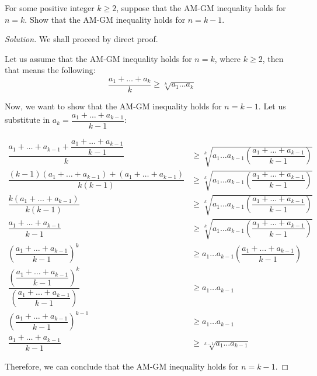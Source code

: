 \documentclass{article}
\newenvironment{solution}{\begin{proof}[Solution]}{\end{proof}}
\begin{document}
\begin{hw}
	For some positive integer $k \geq 2$, suppose that the AM-GM inequality holds for $n=k$. Show that the AM-GM inequality holds for $n=k-1$. 
\end{hw}
\begin{solution}
	We shall proceed by direct proof.
	
	Let us assume that the AM-GM inequality holds for $n=k$, where $k \geq 2$, then that means the following:
	\begin{equation*}
		\dfrac{a_{1} + \ldots + a_{k}}{k} \geq \sqrt[k]{a_{1}\ldots a_{k}}
	\end{equation*}

	Now, we want to show that the AM-GM inequality holds for $n=k-1$. Let us substitute in $a_{k} = \dfrac{a_{1} + \ldots + a_{k-1}}{k-1}$:
	
	\begin{align*}
		\dfrac{a_{1} + \ldots + a_{k-1} + \dfrac{a_{1} + \ldots + a_{k-1}}{k-1}}{k} &\geq \sqrt[k]{a_{1}\ldots a_{k-1}\left( \dfrac{a_{1} + \ldots + a_{k-1}}{k-1} \right)} \\
		\dfrac{(k-1)(a_{1} + \ldots + a_{k-1}) + (a_{1} + \ldots + a_{k-1})}{k(k-1)} &\geq \sqrt[k]{a_{1}\ldots a_{k-1}\left( \dfrac{a_{1} + \ldots + a_{k-1}}{k-1} \right)} \\
		\dfrac{k(a_{1} + \ldots + a_{k-1})}{k(k-1)} &\geq \sqrt[k]{a_{1}\ldots a_{k-1}\left( \dfrac{a_{1} + \ldots + a_{k-1}}{k-1} \right)} \\
		\dfrac{a_{1} + \ldots + a_{k-1}}{k-1} &\geq \sqrt[k]{a_{1}\ldots a_{k-1}\left( \dfrac{a_{1} + \ldots + a_{k-1}}{k-1} \right)} \\
		\left( \dfrac{a_{1} + \ldots + a_{k-1}}{k-1} \right)^{k} &\geq a_{1}\ldots a_{k-1}\left( \dfrac{a_{1} + \ldots + a_{k-1}}{k-1} \right) \\
		\dfrac{\left( \dfrac{a_{1} + \ldots + a_{k-1}}{k-1} \right)^{k}}{\left( \dfrac{a_{1} + \ldots + a_{k-1}}{k-1} \right)} &\geq a_{1}\ldots a_{k-1} \\
		\left( \dfrac{a_{1} + \ldots + a_{k-1}}{k-1} \right)^{k-1} &\geq a_{1}\ldots a_{k-1} \\
		\dfrac{a_{1} + \ldots + a_{k-1}}{k-1} &\geq \sqrt[k-1]{a_{1}\ldots a_{k-1}}
	\end{align*} 

	Therefore, we can conclude that the AM-GM inequality holds for $n=k-1$.
\end{solution}
\end{document}
